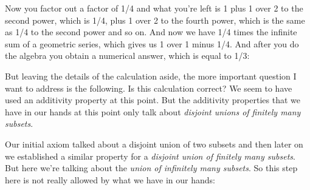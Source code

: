 \documentclass[pdftex, brazil, 12pt, twoside]{article}
\begin{document}
\begin{figure}[H]
  \begin{center}
  \end{center}
\end{figure}

Now you factor out a factor of 1/4 and what you're left is 1
plus 1 over 2 to the second power, which is 1/4, plus 1
over 2 to the fourth power, which is the same as 1/4 to
the second power and so on.
And now we have 1/4 times the infinite sum of a geometric
series, which gives us 1 over 1 minus 1/4.
And after you do the algebra you obtain a numerical answer,
which is equal to 1/3:

\begin{figure}[H]
  \begin{center}
  \end{center}
\end{figure}

But leaving the details of the calculation aside, the more
important question I want to address is the following.
Is this calculation correct?
We seem to have used an additivity
property at this point.
But the additivity properties that we have in our hands at
this point only talk about \emph{disjoint unions of finitely
  many subsets}.

Our initial axiom talked about a disjoint union of two
subsets and then later on we established a similar property
for a \emph{disjoint union of finitely many subsets}.
But here we're talking about the \emph{union of
infinitely many subsets}.
So this step here is not really allowed by what we have
in our hands:
\end{document}
